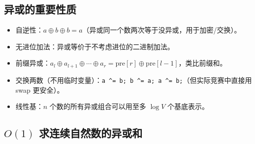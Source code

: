\documentclass[UTF8,openany,oneside,zihao=-4]{ctexbook}
\begin{document}
\subsection{异或的重要性质}

\begin{note}
\begin{itemize}
  \item 自逆性：$a \oplus b \oplus b = a$（异或同一个数两次等于没异或，用于加密/交换）。
  \item 无进位加法：异或等价于不考虑进位的二进制加法。
  \item 前缀异或：$a_l \oplus a_{l+1} \oplus \cdots \oplus a_r = \text{pre}[r] \oplus \text{pre}[l-1]$，类比前缀和。
  \item 交换两数（不用临时变量）：\lstinline|a ^= b; b ^= a; a ^= b;|（但实际竞赛中直接用 swap 更安全）。
  \item 线性基：$n$ 个数的所有异或组合可以用至多 $\log V$ 个基底表示。
\end{itemize}
\end{note}

\subsection{$O(1)$ 求连续自然数的异或和}
\end{document}
